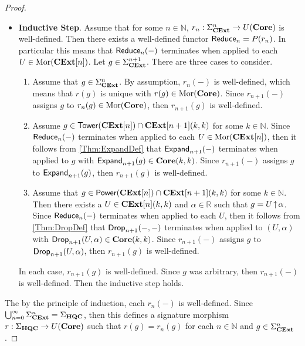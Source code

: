 \begin{proof}
\begin{itemize}
          For some $n \in \mathbb{N}$, $r_n: \Sigma_{\CoreExt}^n \to U( \Core )$ is well-defined.
    \item \textbf{Inductive Step}.
          Assume that for some $n \in \mathbb{N}$, $r_n: \Sigma_{\CoreExt}^n \to U( \Core )$ is well-defined.
          Then there exists a well-defined functor $\mathsf{Reduce}_n = P( r_n )$.
          In particular this means that $\mathsf{Reduce}_n( - )$ terminates when applied to each $U \in \operatorname{Mor}( \mathbf{CExt}[n] )$.
          Let $g \in \Sigma_{\mathbf{CExt}}^{n+1}$.
          There are three cases to consider.
          \begin{enumerate}
          \item Assume that $g \in \Sigma_{\mathbf{CExt}}^n$.
                By assumption, $r_n( - )$ is well-defined, which means that $r( g )$ is unique with $r( g ) \in \operatorname{Mor}( \mathbf{Core} )$.
                Since $r_{n+1}( - )$ assigns $g$ to $r_n( g ) \in \operatorname{Mor}( \mathbf{Core} )$, then $r_{n+1}( g )$ is well-defined.
          \item Assume $g \in \mathsf{Tower}( \mathbf{CExt}[n] ) \cap \mathbf{CExt}[n+1]( k, k )$ for some $k \in \mathbb{N}$.
                Since $\mathsf{Reduce}_n( - )$ terminates when applied to each $U \in \operatorname{Mor}( \mathbf{CExt}[n] )$, then it follows from \cref{Thm:ExpandDef} that $\mathsf{Expand}_{n+1}( - )$ terminates when applied to $g$ with $\mathsf{Expand}_{n+1}( g ) \in \mathbf{Core}( k, k )$.
                Since $r_{n+1}( - )$ assigns $g$ to $\mathsf{Expand}_{n+1}( g )$, then $r_{n+1}( g )$ is well-defined.
          \item Assume that $g \in \mathsf{Power}( \mathbf{CExt}[n] ) \cap \mathbf{CExt}[n+1]( k, k )$ for some $k \in \mathbb{N}$.
                Then there exists a $U \in \mathbf{CExt}[n]( k, k )$ and $\alpha \in \mathbb{R}$ such that $g = U \!\uparrow\! \alpha$.
                Since $\mathsf{Reduce}_n( - )$ terminates when applied to each $U$, then it follows from \cref{Thm:DropDef} that $\mathsf{Drop}_{n+1}( -, - )$ terminates when applied to $( U, \alpha )$ with $\mathsf{Drop}_{n+1}( U, \alpha ) \in \mathbf{Core}( k, k )$.
                Since $r_{n+1}( - )$ assigns $g$ to $\mathsf{Drop}_{n+1}( U, \alpha )$, then $r_{n+1}( g )$ is well-defined.
          \end{enumerate}
          In each case, $r_{n+1}( g )$ is well-defined.
          Since $g$ was arbitrary, then $r_{n+1}( - )$ is well-defined.
          Then the inductive step holds.
    \end{itemize}
    The by the principle of induction, each $r_n( - )$ is well-defined.
    Since $\bigcup_{n=0}^\infty \Sigma_{\mathbf{CExt}}^n = \Sigma_{\mathbf{HQC}}$, then this defines a signature morphism $r: \Sigma_{\mathbf{HQC}} \to U( \mathbf{Core} )$ such that $r( g ) = r_n ( g )$ for each $n \in \mathbb{N}$ and $g \in \Sigma_{\mathbf{CExt}}^n$.

\end{proof}
